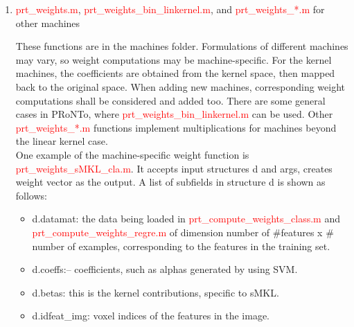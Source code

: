 \begin{enumerate}
\item \textcolor{red}{prt\_weights.m}, \textcolor{red}{prt\_weights\_bin\_linkernel.m}, and \textcolor{red}{prt\_weights\_*.m} for other machines

These functions are in the machines folder. Formulations of different machines may vary, so weight computations may be machine-specific. For the kernel machines, the coefficients are obtained from the kernel space, then mapped back to the original space. When adding new machines, corresponding weight computations shall be considered and added too. There are some general cases in PRoNTo, where \textcolor{red}{prt\_weights\_bin\_linkernel.m} can be used. Other \textcolor{red}{prt\_weights\_*.m} functions implement multiplications for machines beyond the linear kernel case.
\\
 
One example of the machine-specific weight function is \textcolor{red}{prt\_weights\_sMKL\_cla.m}. It accepts input structures d and args, creates weight vector as the output. A list of subfields in structure d is shown as follows:

\begin{itemize}
\item d.datamat: the data being loaded in \textcolor{red}{prt\_compute\_weights\_class.m} and \textcolor{red}{prt\_compute\_weights\_regre.m} of dimension number of $\#$features x $\#$number of examples, corresponding to the features in the training set.
\item d.coeffs:– coefficients, such as alphas generated by using SVM.
\item d.betas: this is the kernel contributions, specific to sMKL.
\item d.idfeat\_img: voxel indices of the features in the image.
\end{itemize}

\end{enumerate}









